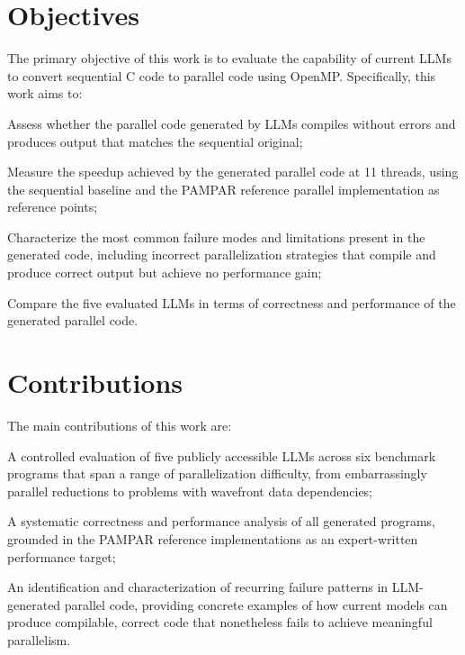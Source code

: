 \section{Objectives}
\label{sec:objectives}

The primary objective of this work is to evaluate the capability of current LLMs to convert sequential C code to parallel code using OpenMP. 
Specifically, this work aims to:

\begin{alineas}
\item Assess whether the parallel code generated by LLMs compiles without errors and produces output that matches the sequential original;
\item Measure the speedup achieved by the generated parallel code at 11 threads, using the sequential baseline and the PAMPAR reference parallel implementation as reference points;
\item Characterize the most common failure modes and limitations present in the generated code, including incorrect parallelization strategies that compile and produce correct output but achieve no performance gain;
\item Compare the five evaluated LLMs in terms of correctness and performance of the generated parallel code.
\end{alineas}

\section{Contributions}
\label{sec:contributions}

The main contributions of this work are:

\begin{alineas}
\item A controlled evaluation of five publicly accessible LLMs across six benchmark programs that span a range of parallelization difficulty, from embarrassingly parallel reductions to problems with wavefront data dependencies;
\item A systematic correctness and performance analysis of all generated programs, grounded in the PAMPAR reference implementations as an expert-written performance target;
\item An identification and characterization of recurring failure patterns in LLM-generated parallel code, providing concrete examples of how current models can produce compilable, correct code that nonetheless fails to achieve meaningful parallelism.
\end{alineas}

